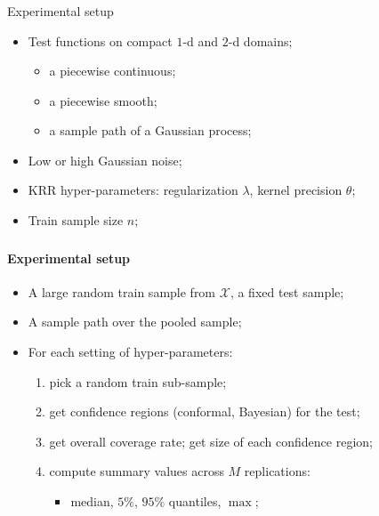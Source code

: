 \documentclass[t]{beamer}  %
\newcommand{\Xcal}{\mathcal{X}}
\begin{document}
\begin{frame}[t]\frametitle{\insertsection}
  \begin{block}{Experimental setup}
  \end{block}
  \begin{itemize}
    \item Test functions on compact $1$-d and $2$-d domains; \begin{itemize}
      \item a piecewise continuous;
      \item a piecewise smooth;
      \item a sample path of a Gaussian process;
    \end{itemize}
    \vspace{\baselineskip}
    \item Low or high Gaussian noise;
    \item KRR hyper-parameters: regularization $\lambda$, kernel precision $\theta$;
    \item Train sample size $n$;
  \end{itemize}
\end{frame}

\begin{frame}[c]\frametitle{\insertsection}
  \framesubtitle{Experimental setup}
  \begin{itemize}
    \item A large random train sample from $\Xcal$, a fixed test sample;
    \item A sample path over the pooled sample;
    \vspace{\baselineskip}
    \item For each setting of hyper-parameters: \begin{enumerate}
      \item pick a random train sub-sample;
      \item get confidence regions (conformal, Bayesian) for the test;
      \vspace{\baselineskip}
      \item get overall coverage rate; get size of each confidence region;
      \item compute summary values across $M$ replications:\begin{itemize}
        \item median, $5\%$, $95\%$ quantiles, $\max$;
      \end{itemize}
    \end{enumerate}
  \end{itemize}
\end{frame}
\end{document}

